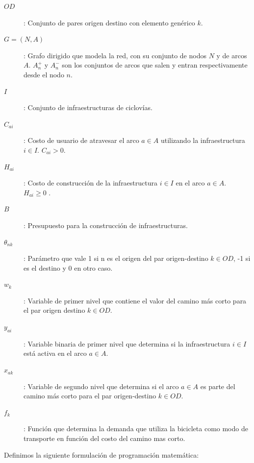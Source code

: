 \documentclass{article}
\begin{document}
  \begin{description}
    \item[$OD$]: Conjunto de pares origen destino con elemento genérico $k$.
    \item[$G=(N,A)$]: Grafo dirigido que modela la red, con su conjunto de nodos $N$ y de arcos $A$. $A_n^+$ y $A_n^-$ son los conjuntos de arcos que salen y entran respectivamente desde el nodo $n$.
    \item[$I$]: Conjunto de infraestructuras de ciclovías.
    \item[$C_{ai}$]: Costo de usuario de atravesar el arco $a \in A$ utilizando la infraestructura $i \in I$. $C_{ai} > 0$.
    \item[$H_{ai}$]: Costo de construcción de la infraestructura $i \in I$ en el arco $a \in A$. $H_{ai} \geq 0$ .
    \item[$B$]: Presupuesto para la construcción de infraestructuras.
    \item[$\theta_{nk}$]: Parámetro que vale 1 si n es el origen del par origen-destino $k \in OD$, -1 si es el destino y 0 en otro caso.
    \item[$w_k$]: Variable de primer nivel que contiene el valor del camino más corto para el par origen destino $k \in OD$.
    \item[$y_{ai}$]: Variable binaria de primer nivel que determina si la infraestructura $i \in I$ está activa en el arco $a \in A$.
    \item[$x_{ak}$]: Variable de segundo nivel que determina si el arco $a \in A$ es parte del camino más corto para el par origen-destino $k \in OD$.
    \item[$f_k$]: Función que determina la demanda que utiliza la bicicleta como modo de transporte en función del costo del camino mas corto.
  \end{description}

  Definimos la siguiente formulación de programación matemática:
\end{document}
